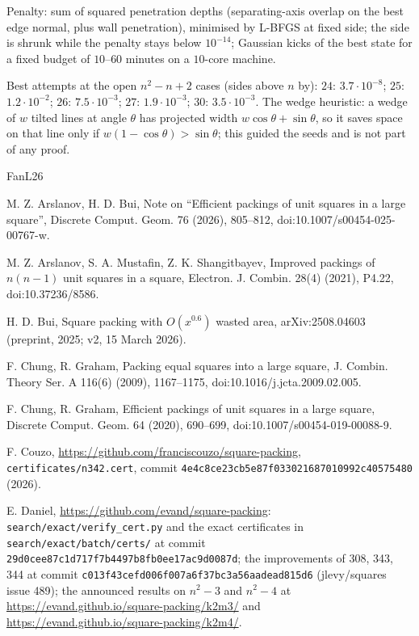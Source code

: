 \documentclass[11pt,letterpaper]{amsart}
\theoremstyle{plain}
\begin{document}
Penalty: sum of squared penetration depths (separating-axis overlap on the best edge normal, plus wall penetration), minimised by L-BFGS at fixed side; the side is shrunk while the penalty stays below $10^{-14}$; Gaussian kicks of the best state for a fixed budget of $10$--$60$ minutes on a $10$-core machine.

Best attempts at the open $n^2 - n + 2$ cases (sides above $n$ by): $24$: $3.7 \cdot 10^{-8}$; $25$: $1.2 \cdot 10^{-2}$; $26$: $7.5 \cdot 10^{-3}$; $27$: $1.9 \cdot 10^{-3}$; $30$: $3.5 \cdot 10^{-3}$. The wedge heuristic: a wedge of $w$ tilted lines at angle $\theta$ has projected width $w\cos\theta + \sin\theta$, so it saves space on that line only if $w(1 - \cos\theta) > \sin\theta$; this guided the seeds and is not part of any proof.

\begin{thebibliography}{FanL26}

 M. Z. Arslanov, H. D. Bui, Note on ``Efficient packings of unit squares in a large square'', Discrete Comput. Geom. 76 (2026), 805--812, doi:10.1007/s00454-025-00767-w.

 M. Z. Arslanov, S. A. Mustafin, Z. K. Shangitbayev, Improved packings of $n(n-1)$ unit squares in a square, Electron. J. Combin. 28(4) (2021), P4.22, doi:10.37236/8586.

 H. D. Bui, Square packing with $O(x^{0.6})$ wasted area, arXiv:2508.04603 (preprint, 2025; v2, 15 March 2026).

 F. Chung, R. Graham, Packing equal squares into a large square, J. Combin. Theory Ser. A 116(6) (2009), 1167--1175, doi:10.1016/j.jcta.2009.02.005.

 F. Chung, R. Graham, Efficient packings of unit squares in a large square, Discrete Comput. Geom. 64 (2020), 690--699, doi:10.1007/s00454-019-00088-9.

 F. Couzo, \url{https://github.com/franciscouzo/square-packing}, \texttt{certificates/n342.cert}, commit \texttt{4e4c8ce23cb5e87f033021687010992c40575480} (2026).

 E. Daniel, \url{https://github.com/evand/square-packing}: \texttt{search/exact/verify\_cert.py} and the exact certificates in \texttt{search/exact/batch/certs/} at commit \texttt{29d0cee87c1d717f7b4497b8fb0ee17ac9d0087d}; the improvements of 308, 343, 344 at commit \texttt{c013f43cefd006f007a6f37bc3a56aadead815d6} (jlevy/squares issue 489); the announced results on $n^2 - 3$ and $n^2 - 4$ at \url{https://evand.github.io/square-packing/k2m3/} and \url{https://evand.github.io/square-packing/k2m4/}.


\end{thebibliography}
\end{document}
